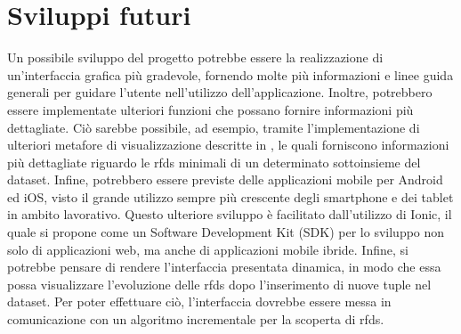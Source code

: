 \section{Sviluppi futuri}
Un possibile sviluppo del progetto potrebbe essere la realizzazione di un'interfaccia grafica pi\`{u} gradevole, fornendo molte pi\`{u} informazioni e linee guida generali per guidare l'utente nell'utilizzo dell'applicazione. Inoltre, potrebbero essere implementate ulteriori funzioni che possano fornire informazioni pi\`{u} dettagliate. Ci\`{o} sarebbe possibile, ad esempio, tramite l'implementazione di ulteriori metafore di visualizzazione descritte in \cite{mdvisualization}, le quali forniscono informazioni pi\`{u} dettagliate riguardo le \acrlong{rfds} minimali di un determinato sottoinsieme del dataset. Infine, potrebbero essere previste delle applicazioni mobile per Android ed iOS, visto il grande utilizzo sempre pi\`{u} crescente degli smartphone e dei tablet in ambito lavorativo. Questo ulteriore sviluppo \`{e} facilitato dall'utilizzo di Ionic, il quale si propone come un Software Development Kit (SDK) per lo sviluppo non solo di applicazioni web, ma anche di applicazioni mobile ibride. Infine, si potrebbe pensare di rendere l'interfaccia presentata dinamica, in modo che essa possa visualizzare l'evoluzione delle \acrshort{rfds} dopo l'inserimento di nuove tuple nel dataset. Per poter effettuare ci\`{o}, l'interfaccia dovrebbe essere messa in comunicazione con un algoritmo incrementale per la scoperta di \acrshort{rfds}.

\newpage
